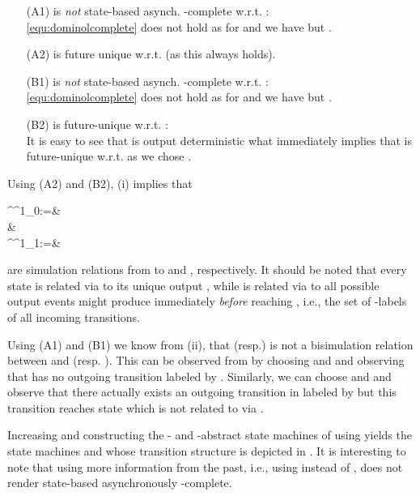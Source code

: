 \begin{enumerate}
 \item[(A1)]  is \emph{not} state-based asynch. -complete w.r.t. :\\
 \eqref{equ:dominolcomplete} does not hold as for  and  we have  but .
 \item[(A2)]  is future unique w.r.t.  (as this always holds).
\item[(B1)]  is \emph{not} state-based asynch. -complete w.r.t. :\\
\eqref{equ:dominolcomplete} does not hold as for  and  we have  but .
 \item[(B2)]  is future-unique w.r.t. :\\
 It is easy to see that  is output deterministic what immediately implies that  is future-unique w.r.t.  as we chose .
\end{enumerate}

\noindent Using (A2) and (B2),  (i) implies that

 \R^{\Interval^1_0}:=&
 \cup{}
 \cup{}\notag\\
 &\cup{}\cup{}~\\
   \R^{\Interval^1_1}:=&

are simulation relations from  to  and , respectively. It should be noted that every state  is related via  to its unique output , while  is related via  to all possible output events  might produce immediately \emph{before} reaching , i.e., the set of -labels of all incoming transitions. 

Using (A1) and (B1) we know from  (ii), that  (resp.) is not a bisimulation relation between  and  (resp. ). This can be observed from  by choosing  and  and observing that  has no outgoing transition labeled by . Similarly, we can choose   and  and observe that there actually exists an outgoing transition in  labeled by  but this transition reaches state  which is not related to  via . 







Increasing  and constructing the - and  -abstract state machines of  using  yields the state machines  and  whose transition structure is depicted in . It is interesting to note that using more information from the past, i.e., using  instead of , does not render  state-based asynchronously -complete.

